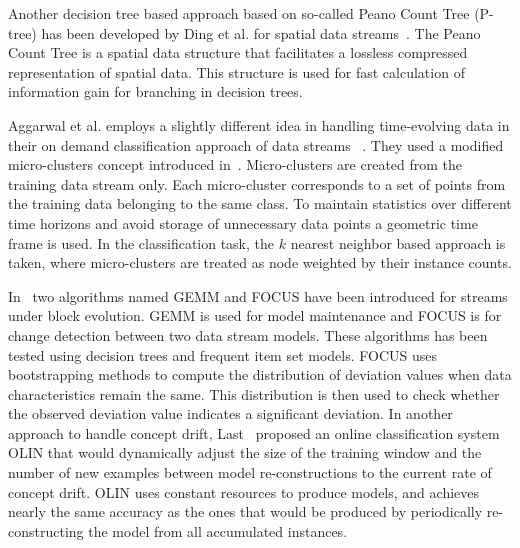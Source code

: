 Another decision tree based approach based on so-called Peano Count Tree (P-tree) has been developed by Ding et al. for spatial data streams~\cite{ding02:peanocount}. The Peano Count Tree is a spatial data structure that facilitates a lossless compressed representation of spatial data. This structure is used for fast calculation of information gain for branching in decision trees.

Aggarwal et al. employs a slightly different idea in handling time-evolving data in their on demand classification approach of data streams ~\cite{aggarwal04:ondemand}. They used a modified micro-clusters concept introduced in~\cite{aggarwal03:clustream}. Micro-clusters are created from the training data stream only. Each micro-cluster corresponds to a set of points from the training data belonging to the same class. To maintain statistics over different time horizons and avoid storage of unnecessary data points a geometric time frame is used. In the classification task, the $k$ nearest neighbor based approach is taken, where micro-clusters are treated as node weighted by their instance counts. 

In~\cite{ganti02:gemm:focus} two algorithms named GEMM and FOCUS have been introduced for streams under block evolution. GEMM is used for model maintenance and FOCUS is for change detection between two data stream models. These algorithms has been tested using decision trees and frequent item set models. FOCUS uses bootstrapping methods to compute the distribution of deviation values when data characteristics remain the same. This distribution is then used to check whether the observed deviation value indicates a significant deviation.
In another approach to handle concept drift, Last~\cite{last02:olin} proposed an online classification system OLIN that would dynamically adjust the size of the training window and the number of new examples between model re-constructions to the current rate of concept drift. OLIN uses constant resources to produce models, and achieves nearly the same accuracy as the ones that would be produced by periodically re-constructing the model from all accumulated instances.

